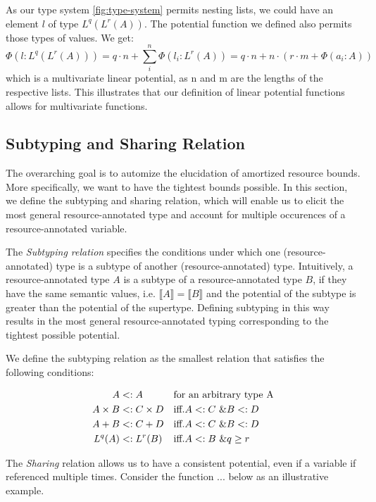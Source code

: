 As our type system \ref{fig:type-system} permits nesting lists, we could have an element $l$ of type $L^q(L^r(A))$. The potential function we defined also permits those types of values. We get: 
$$\Phi(l : L^q(L^r(A))) = q \cdot n + \displaystyle\sum_{i}^{n} \Phi(l_i : L^r(A)) = q \cdot n + n \cdot (r \cdot m + \Phi(a_i : A)) $$ 
which is a multivariate linear potential, as n and m are the lengths of the respective lists. This illustrates that our definition of linear potential functions allows for multivariate functions.

\subsection{Subtyping and Sharing Relation}
The overarching goal is to automize the elucidation of amortized resource bounds. More specifically, we want to have the tightest bounds possible. In this section, we define the subtyping and sharing relation, which will enable us to elicit the most general resource-annotated type and account for multiple occurences of a resource-annotated variable.

The \emph{Subtyping relation} specifies the conditions under which one (resource-annotated) type is a subtype of another (resource-annotated) type. Intuitively, a resource-annotated type $A$ is a subtype of a resource-annotated type $B$, if they have the same semantic values, i.e. $\llbracket A \rrbracket = \llbracket B \rrbracket$ and the potential of the subtype is greater than the potential of the supertype. Defining subtyping in this way results in the most general resource-annotated typing corresponding to the tightest possible potential.

We define the subtyping relation as the smallest relation that satisfies the following conditions:

\begin{align*}
   A & <: A && \text{for an arbitrary type A} \\
   A \times B & <: C \times D && \text{iff.} A <: C ~ \& B <: D \\
   A + B & <: C + D && \text{iff.} A <: C ~ \& B <: D \\
   L^q(A) & <: L^r(B) && \text{iff.} A <: B ~ \& q \geq r \\
\end{align*}

The \emph{Sharing} relation allows us to have a consistent potential, even if a variable if referenced multiple times. Consider the function ... below as an illustrative example.

